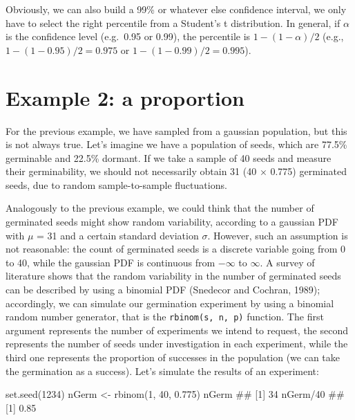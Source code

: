 \documentclass[a4paper,12pt,oneside]{book}
\newenvironment{Shaded}{\begin{snugshade}}{\end{snugshade}}
\newcommand{\DecValTok}[1]{#1}
\newcommand{\FloatTok}[1]{#1}
\newcommand{\SpecialCharTok}[1]{#1}
\newcommand{\DocumentationTok}[1]{#1}
\newcommand{\OtherTok}[1]{#1}
\newcommand{\FunctionTok}[1]{#1}
\newcommand{\NormalTok}[1]{#1}
\begin{document}
Obviously, we can also build a 99\% or whatever else confidence interval, we only have to select the right percentile from a Student's t distribution. In general, if \(\alpha\) is the confidence level (e.g.~0.95 or 0.99), the percentile is \(1 - (1 - \alpha)/2\) (e.g., \(1 - (1 - 0.95)/2 = 0.975\) or \(1 - (1 - 0.99)/2 = 0.995\)).

\hypertarget{example-2-a-proportion}{%
\section{Example 2: a proportion}\label{example-2-a-proportion}}

For the previous example, we have sampled from a gaussian population, but this is not always true. Let's imagine we have a population of seeds, which are 77.5\% germinable and 22.5\% dormant. If we take a sample of 40 seeds and measure their germinability, we should not necessarily obtain 31 (40 \(\times\) 0.775) germinated seeds, due to random sample-to-sample fluctuations.

Analogously to the previous example, we could think that the number of germinated seeds might show random variability, according to a gaussian PDF with \(\mu\) = 31 and a certain standard deviation \(\sigma\). However, such an assumption is not reasonable: the count of germinated seeds is a discrete variable going from 0 to 40, while the gaussian PDF is continuous from \(-\infty\) to \(\infty\). A survey of literature shows that the random variability in the number of germinated seeds can be described by using a binomial PDF (Snedecor and Cochran, 1989); accordingly, we can simulate our germination experiment by using a binomial random number generator, that is the \texttt{rbinom(s,\ n,\ p)} function. The first argument represents the number of experiments we intend to request, the second represents the number of seeds under investigation in each experiment, while the third one represents the proportion of successes in the population (we can take the germination as a success). Let's simulate the results of an experiment:

\begin{Shaded}
\begin{Highlighting}[]
\FunctionTok{set.seed}\NormalTok{(}\DecValTok{1234}\NormalTok{)}
\NormalTok{nGerm }\OtherTok{\textless{}{-}} \FunctionTok{rbinom}\NormalTok{(}\DecValTok{1}\NormalTok{, }\DecValTok{40}\NormalTok{, }\FloatTok{0.775}\NormalTok{)}
\NormalTok{nGerm}
\DocumentationTok{\#\# [1] 34}
\NormalTok{nGerm}\SpecialCharTok{/}\DecValTok{40}
\DocumentationTok{\#\# [1] 0.85}
\end{Highlighting}
\end{Shaded}
\end{document}
